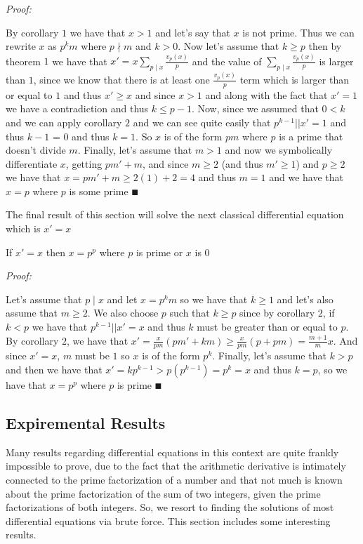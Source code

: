 \documentclass[paper=a4,fontsize=paper,12.5pt]{book}
\newcommand{\3}{\vspace*{3mm}}
\newcommand{\Proof}{\textit{Proof:}}
\newcommand{\D}{\vert \vert}
\newcommand{\Der}[1]{#1\sum_{p \mid #1} \frac{v_p(#1)}{p}}
\newcommand{\Id}[1]{\sum_{p \mid #1} \frac{v_p(#1)}{p}}
\newcommand{\Par}[2]{\frac{v_#2(#1)}{#2}}
\begin{document}
\Proof
 
By corollary $1$ we have that $x>1$ and let's say that $x$ is not prime. Thus we can rewrite $x$ as $p^k m$ where $p \nmid m$ and $k>0$. Now let's assume that $k\geq p$ then by theorem $1$ we have that $x' = \Der{x}$ and the value of $\Id{x}$ is larger than $1$, since we know that there is at least one $\Par{x}{p}$ term which is larger than or equal to $1$ and thus $x' \geq x$ and since $x>1$ and along with the fact that $x' =1$ we have a contradiction and thus $k \leq p-1$. Now, since we assumed that $0<k$ and we can apply corollary $2$ and we can see quite easily that $p^{k-1} \D x' = 1$ and thus $k-1$ = 0 and thus $k=1$. So $x$ is of the form $pm$ where $p$ is a prime that doesn't divide $m$. Finally, let's assume that $m>1$ and now we symbolically differentiate $x$, getting $pm' + m$, and since $m\geq 2$ \vspace*{.05mm} (and thus $m' \geq1$) and $p \geq2$ we have that $x =  pm' + m \geq 2(1) + 2 = 4 $ and thus $m =1$ and we have that $x =p$ where $p$ is some prime $\QED$
 

\3

The final result of this section will solve the next classical differential equation which is $x' = x$

\begin{theorem}

If $x' =x $ then $x = p^p$ where $p$ is prime or $x$ is $0$


\end{theorem}

\Proof

Let's assume that $p \mid x$ and let $x = p^km$ so we have that $k\geq 1$ and let's also assume that $m\geq 2$. We also choose $p$ such that $k \geq p$ since by corollary $2$,  if $k <p $ we have that $p^{k-1} \D x' = x$ and thus $k$ must be greater than or equal to $p$. By corollary $2$, we have that $x' = \frac{x}{pm}(pm' + km) \geq \frac{x}{pm}(p + pm) = \frac{m+1}{m}x$. And since $x' = x$, $m$ must be $1$ so $x$ is of the form $p^k$. Finally, let's assume that $k>p$ and then we have that $x' = kp^{k-1} >  p(p^{k-1}) = p^{k} = x$ and thus $k = p$, so we have that $x = p^p$ where $p$ is prime $\QED$


\subsection*{Expiremental Results} 

Many results regarding differential equations in this context are quite frankly impossible to prove, due to the fact that the arithmetic derivative is intimately connected to the prime factorization of a number and that not much is known about the prime factorization of the sum of two integers, given the prime factorizations of both integers. So, we resort to finding the solutions of most differential equations via brute force. This section includes some interesting results. 
\end{document}
